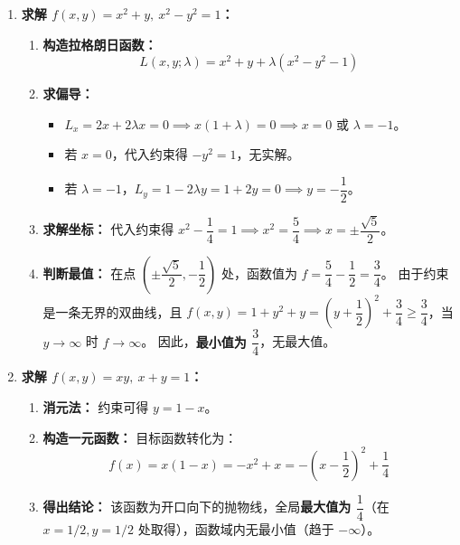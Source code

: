 \documentclass[lang=cn,11pt]{elegantbook}
\begin{document}
\begin{solution}
\begin{enumerate}
    \item[(1)] \textbf{求解 $f(x,y)=x^2+y,\ x^2-y^2=1$：}
    \begin{enumerate}
        \item \textbf{构造拉格朗日函数：}
        \[ L(x,y;\lambda) = x^2+y + \lambda(x^2-y^2-1) \]
        \item \textbf{求偏导：}
        \begin{itemize}
            \item $L_x = 2x + 2\lambda x = 0 \implies x(1+\lambda)=0 \implies x=0$ 或 $\lambda=-1$。
            \item 若 $x=0$，代入约束得 $-y^2=1$，无实解。
            \item 若 $\lambda=-1$，$L_y = 1 - 2\lambda y = 1 + 2y = 0 \implies y=-\dfrac{1}{2}$。
        \end{itemize}
        \item \textbf{求解坐标：}
        代入约束得 $x^2 - \dfrac{1}{4} = 1 \implies x^2 = \dfrac{5}{4} \implies x = \pm \dfrac{\sqrt{5}}{2}$。
        \item \textbf{判断最值：}
        在点 $\left(\pm \dfrac{\sqrt{5}}{2}, -\dfrac{1}{2}\right)$ 处，函数值为 $f = \dfrac{5}{4} - \dfrac{1}{2} = \dfrac{3}{4}$。
        由于约束是一条无界的双曲线，且 $f(x,y) = 1+y^2+y = \left(y+\dfrac{1}{2}\right)^2 + \dfrac{3}{4} \ge \dfrac{3}{4}$，当 $y \to \infty$ 时 $f \to \infty$。
        因此，\textbf{最小值为 $\dfrac{3}{4}$}，无最大值。
    \end{enumerate}

    \item[(2)] \textbf{求解 $f(x,y)=xy,\ x+y=1$：}
    \begin{enumerate}
        \item \textbf{消元法：}
        约束可得 $y = 1-x$。
        \item \textbf{构造一元函数：}
        目标函数转化为：
        \[ f(x) = x(1-x) = -x^2+x = -\left(x-\frac{1}{2}\right)^2 + \frac{1}{4} \]
        \item \textbf{得出结论：}
        该函数为开口向下的抛物线，全局\textbf{最大值为 $\dfrac{1}{4}$}（在 $x=1/2, y=1/2$ 处取得），函数域内无最小值（趋于 $-\infty$）。
    \end{enumerate}


\end{enumerate}
\end{solution}
\end{document}
